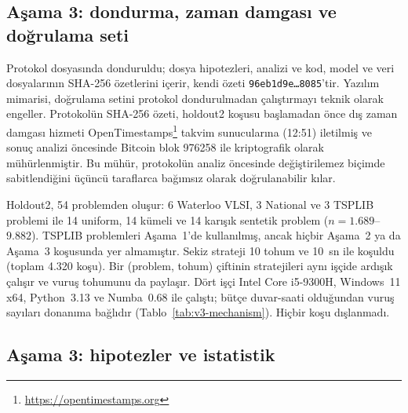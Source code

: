 \subsection{Aşama 3: dondurma, zaman damgası ve doğrulama seti}\label{sec:deney-dondurma}

Protokol  dosyasında donduruldu; dosya hipotezleri, analizi ve kod, model ve
veri dosyalarının SHA-256 özetlerini içerir, kendi özeti \texttt{96eb1d9e\ldots8085}'tir.
Yazılım mimarisi, doğrulama setini protokol dondurulmadan çalıştırmayı teknik olarak engeller.
Protokolün SHA-256 özeti, holdout2 koşusu başlamadan önce dış zaman damgası hizmeti
OpenTimestamps\footnote{\url{https://opentimestamps.org}} takvim sunucularına (12:51) iletilmiş
ve sonuç analizi öncesinde Bitcoin blok 976258 ile kriptografik olarak mühürlenmiştir.
Bu mühür, protokolün analiz öncesinde değiştirilemez biçimde sabitlendiğini üçüncü taraflarca
bağımsız olarak doğrulanabilir kılar.

Holdout2, 54 problemden oluşur: 6 Waterloo VLSI, 3 National ve 3 TSPLIB problemi ile 14 uniform,
14 kümeli ve 14 karışık sentetik problem ($n=1.689$--$9.882$).
TSPLIB problemleri Aşama~1'de kullanılmış, ancak hiçbir Aşama~2 ya da Aşama~3 koşusunda yer
almamıştır. Sekiz strateji 10 tohum ve 10~sn ile koşuldu (toplam 4.320 koşu).
Bir (problem, tohum) çiftinin stratejileri aynı işçide ardışık çalışır ve vuruş tohumunu da
paylaşır. Dört işçi Intel Core i5-9300H, Windows~11 x64, Python~3.13 ve Numba~0.68
ile çalıştı; bütçe duvar-saati olduğundan vuruş sayıları donanıma bağlıdır
(Tablo~\ref{tab:v3-mechanism}). Hiçbir koşu dışlanmadı.

\subsection{Aşama 3: hipotezler ve istatistik}\label{sec:deney-istatistik}

